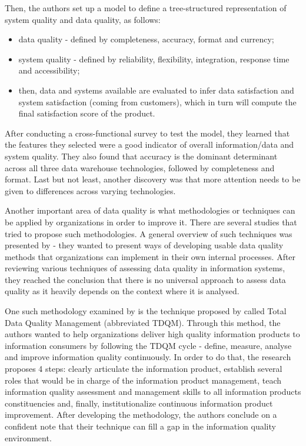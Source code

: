 \documentclass{mprop}
\begin{document}
Then, the authors set up a model to define a tree-structured representation
of system quality and data quality, as follows:
  \begin{itemize}
    \item data quality - defined by completeness, accuracy, format and currency;
    \item system quality - defined by reliability, flexibility, integration,
    response time and accessibility;
    \item then, data and systems available are evaluated to infer 
    data satisfaction and system satisfaction (coming from customers), which
    in turn will compute the final satisfaction score of the product.
  \end{itemize}

After conducting a cross-functional survey to test the model, they learned that
the features they selected were a good indicator of overall information/data and
system quality. They also found that accuracy is the dominant determinant across
all three data warehouse technologies, followed by completeness and format. Last
but not least, another discovery was that more attention needs to be given to
differences across varying technologies.

Another important area of data quality is what methodologies or techniques can 
be applied by organizations in order to improve it. 
There are several studies that tried to propose such methodologies. A general 
overview of such techniques  was presented by \citet{pipino2002data} - they 
wanted to present ways of developing usable  data quality methods that 
organizations can implement in their own internal processes. After reviewing 
various techniques of assessing data quality in information systems, they reached 
the conclusion that there is no universal approach to assess data quality as it  
heavily depends on the context where it is analysed. 

One such methodology examined by \citet{pipino2002data} is the technique 
proposed by \citet{wang1998product} called Total Data Quality Management
(abbreviated TDQM). Through this method, the authors wanted to help 
organizations deliver high quality information products to information
consumers by following the TDQM cycle - define, measure, analyse and improve
information quality continuously. In order to do that, the research proposes
4 steps: clearly articulate the information product, establish several roles
that would be in charge of the information product management, teach information
quality assessment and management skills to all information products 
constituencies and, finally, institutionalize continuous information product 
improvement. After developing the methodology, the authors conclude on a 
confident note that their technique can fill a gap in the information quality
environment.
\end{document}
